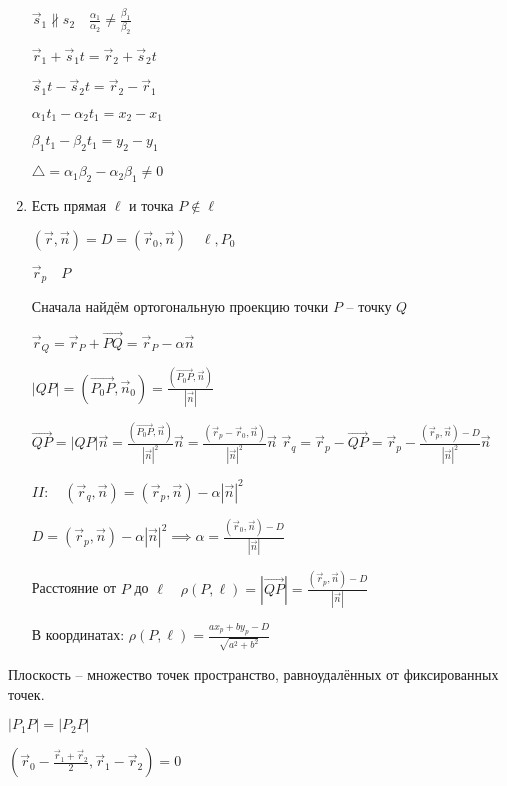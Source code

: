 \documentclass{book}
\theoremstyle{definition}
\newcommand\vect[1]{\overset{\longrightarrow}{#1}}
\begin{document}
\begin{enumerate}
        $\vec s_1 \not\parallel s_2\quad \frac{\alpha_1}{\alpha_2}\neq \frac{\beta_1}{\beta_2}$ 

        $\vec r_1 + \vec s_1t = \vec r_2+\vec s_2 t$

        $\vec s_1t-\vec s_2t = \vec r_2-\vec r_1$

        $\alpha_1t_1-\alpha_2t_1 = x_2-x_1$

        $\beta_1t_1-\beta_2t_1 = y_2-y_1$

        $\triangle = \alpha_1\beta_2-\alpha_2\beta_1\neq 0$
    \item Есть прямая $\ell $ и точка $P\not\in \ell $

        $(\vec r, \vec n)=D = \left( \vec r_0, \vec n \right) \quad \ell, P_0 $

        $\vec r_p\quad P$

        Сначала найдём ортогональную проекцию точки  $P$ -- точку  $Q$

        $\vec r_Q = \vec r_P+\vect{PQ} = \vec r_P-\alpha\vec n$

        $\left| QP \right| = (\vect{P_0P}, \vec n_0) = \frac{ \left(\vect{P_0P}, \vec n \right)}{\left| \vec n \right| } $ 

        $\vect{QP} = \left| QP \right| \vec n = \frac{\left( \vect{P_0P}, \vec n \right) }{\left| \vec n \right| ^2}\vec n = \frac{\left( \vec r_p-\vec r_0, \vec n \right) }{\left| \vec n \right| ^2}\vec n$ 
        $\vec r_q = \vec r_p-\vect{QP} = \vec r_p - \frac{\left( \vec r_p, \vec n \right) -D}{\left| \vec n \right| ^2}\vec n$ 

        $II: \quad \left( \vec r_q, \vec n \right)  = \left( \vec r_p, \vec n \right) - \alpha \left| \vec n \right| ^2$

        $D = \left( \vec r_p, \vec n \right) -\alpha \left| \vec n \right| ^2 \implies \alpha = \frac{\left( \vec r_0, \vec n \right) -D}{\left| \vec n \right| }$

        Расстояние от $P$ до  $\ell \quad \rho(P, \ell ) = \left| \vect{QP} \right| = \frac{\left( \vec r_p, \vec n \right) -D}{\left| \vec n \right| }$

        В координатах: $\rho(P, \ell ) = \frac{ax_p+by_p-D}{\sqrt{a^2+b^2} }$
\end{enumerate}

Плоскость -- множество точек пространство, равноудалённых от фиксированных точек.

$\left| P_1P \right|  = \left| P_2P \right| $

$\left( \vec r_0- \frac{\vec r_1+\vec r_2}{2}, \vec r_1-\vec r_2 \right) = 0 $ 
\end{document}

